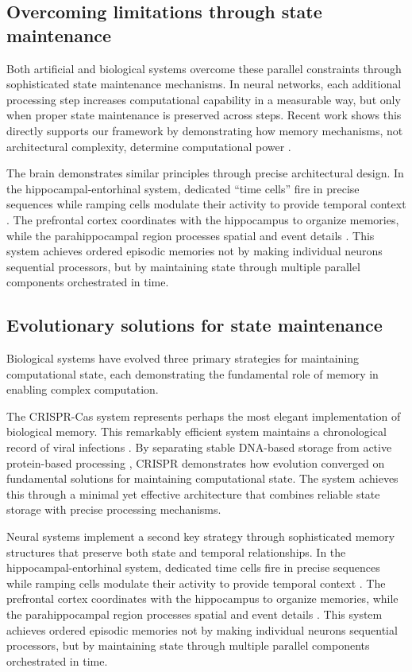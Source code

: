\documentclass[12pt]{article}
\begin{document}
\subsection{Overcoming limitations through state maintenance}

Both artificial and biological systems overcome these parallel constraints through sophisticated state maintenance mechanisms.
In neural networks, each additional processing step increases computational capability in a measurable way, but only when proper state maintenance is preserved across steps.
Recent work shows this directly supports our framework by demonstrating how memory mechanisms, not architectural complexity, determine computational power \cite{merrill2024}.

The brain demonstrates similar principles through precise architectural design.
In the hippocampal-entorhinal system, dedicated ``time cells'' fire in precise sequences while ramping cells modulate their activity to provide temporal context \cite{quentin2019differential}.
The prefrontal cortex coordinates with the hippocampus to organize memories, while the parahippocampal region processes spatial and event details \cite{martini2015information}.
This system achieves ordered episodic memories not by making individual neurons sequential processors, but by maintaining state through multiple parallel components orchestrated in time.

\subsection{Evolutionary solutions for state maintenance}

Biological systems have evolved three primary strategies for maintaining computational state, each demonstrating the fundamental role of memory in enabling complex computation.

The CRISPR-Cas system represents perhaps the most elegant implementation of biological memory.
This remarkably efficient system maintains a chronological record of viral infections \cite{kim2019crispr}.
By separating stable DNA-based storage from active protein-based processing \cite{sadremomtaz2023digital}, CRISPR demonstrates how evolution converged on fundamental solutions for maintaining computational state.
The system achieves this through a minimal yet effective architecture that combines reliable state storage with precise processing mechanisms.

Neural systems implement a second key strategy through sophisticated memory structures that preserve both state and temporal relationships.
In the hippocampal-entorhinal system, dedicated time cells fire in precise sequences while ramping cells modulate their activity to provide temporal context \cite{quentin2019differential}.
The prefrontal cortex coordinates with the hippocampus to organize memories, while the parahippocampal region processes spatial and event details \cite{martini2015information}.
This system achieves ordered episodic memories not by making individual neurons sequential processors, but by maintaining state through multiple parallel components orchestrated in time.
\end{document}
